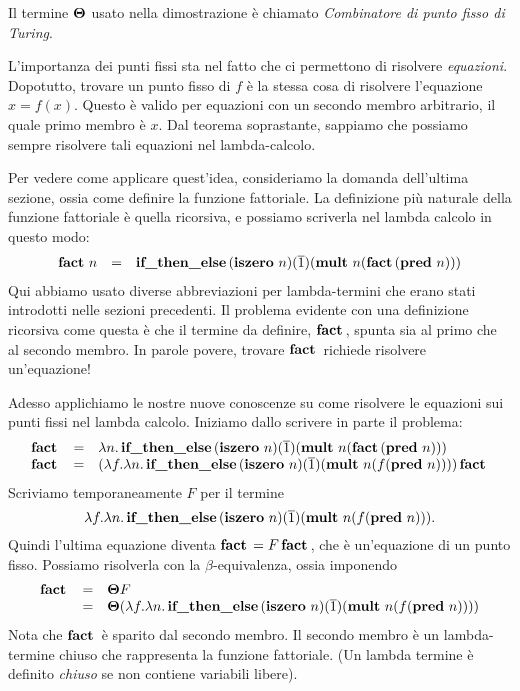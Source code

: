 \documentclass{article}
\begin{document}
Il termine $\textbf{\boldmath $\Theta$}$ usato nella dimostrazione \`e chiamato 
{\em Combinatore di punto fisso di Turing}. 

L'importanza dei punti fissi sta nel fatto che ci permettono
di risolvere {\em equazioni}. Dopotutto, trovare un punto fisso di $f$ 
\`e la stessa cosa di risolvere l'equazione $x = f(x)$. Questo \`e valido
per equazioni con un secondo membro arbitrario, il quale primo membro 
\`e $x$. Dal teorema soprastante, sappiamo che possiamo sempre risolvere 
tali equazioni nel lambda-calcolo.

Per vedere come applicare quest'idea, consideriamo la domanda 
dell'ultima sezione, ossia come definire la funzione fattoriale. La definizione
pi\`u naturale della funzione fattoriale \`e quella ricorsiva, e
possiamo scriverla nel lambda calcolo in questo modo:
\[ \begin{array}{rcl} 
  \mathop{\textbf{\bf fact}\,} n &=& \mathop{\textbf{\bf if\_then\_else}\,} (\mathop{\textbf{\bf iszero}\,} n) (\mathop{\overline{1}}) (\mathop{\textbf{\bf mult}\,} n (\mathop{\textbf{\bf fact}\,}
  (\mathop{\textbf{\bf pred}\,} n)))
 \end{array}
 \]
Qui abbiamo usato diverse abbreviazioni per lambda-termini che
erano stati introdotti nelle sezioni precedenti. Il problema evidente
con una definizione ricorsiva come questa \`e che il termine da definire,
$\mathop{\textbf{\bf fact}\,}$, spunta sia al primo che al secondo membro. In
parole povere, trovare $\mathop{\textbf{\bf fact}\,}$ richiede risolvere un'equazione!

Adesso applichiamo le nostre nuove conoscenze su come risolvere le equazioni
sui punti fissi nel lambda calcolo. Iniziamo dallo scrivere in parte il problema:
\[ \begin{array}{rcl} 
  \mathop{\textbf{\bf fact}\,} &=& \lambda n.\mathop{\textbf{\bf if\_then\_else}\,} (\mathop{\textbf{\bf iszero}\,} n) (\mathop{\overline{1}}) (\mathop{\textbf{\bf mult}\,} n (\mathop{\textbf{\bf fact}\,}
  (\mathop{\textbf{\bf pred}\,} n))) \\
  \mathop{\textbf{\bf fact}\,} &=& (\lambda f.\lambda n.\mathop{\textbf{\bf if\_then\_else}\,} (\mathop{\textbf{\bf iszero}\,} n) (\mathop{\overline{1}})
  (\mathop{\textbf{\bf mult}\,} n (f (\mathop{\textbf{\bf pred}\,} n)))) \mathop{\textbf{\bf fact}\,}
\end{array}
\]
Scriviamo temporaneamente $F$ per il termine
\[ \lambda f.\lambda n.\mathop{\textbf{\bf if\_then\_else}\,} (\mathop{\textbf{\bf iszero}\,} n) (\mathop{\overline{1}}) (\mathop{\textbf{\bf mult}\,} n (f
   (\mathop{\textbf{\bf pred}\,} n))). 
\]
Quindi l'ultima equazione diventa $\mathop{\textbf{\bf fact}\,} = F \mathop{\textbf{\bf fact}\,}$, che \`e un'equazione
di un punto fisso. Possiamo risolverla con la $\beta$-equivalenza, ossia
imponendo
\[ \begin{array}{rcl} 
  \mathop{\textbf{\bf fact}\,} &=& \textbf{\boldmath $\Theta$} F \\
  &=& \textbf{\boldmath $\Theta$} (\lambda f.\lambda n.\mathop{\textbf{\bf if\_then\_else}\,} (\mathop{\textbf{\bf iszero}\,} n) (\mathop{\overline{1}})
  (\mathop{\textbf{\bf mult}\,} n (f (\mathop{\textbf{\bf pred}\,} n))))
\end{array}
\]
Nota che $\mathop{\textbf{\bf fact}\,}$ \`e sparito dal secondo membro. Il
secondo membro \`e un lambda-termine chiuso che rappresenta la funzione
fattoriale. (Un lambda termine \`e definito {\em chiuso} se non contiene variabili libere).
\end{document}

